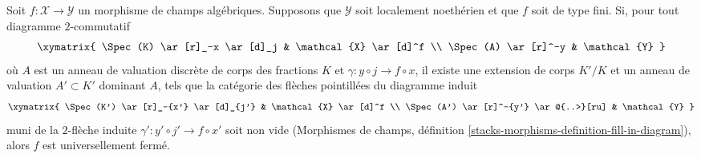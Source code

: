 \begin{lemma}
\label{lemma-valuative-criterion-universally-closed}
Soit $f : \mathcal{X} \to \mathcal{Y}$ un morphisme de champs algébriques.
Supposons que $\mathcal{Y}$ soit localement noethérien et que $f$ soit de type fini.
Si, pour tout diagramme $2$-commutatif
$$
\xymatrix{
\Spec(K) \ar[r]_-x \ar[d]_j & \mathcal{X} \ar[d]^f \\
\Spec(A) \ar[r]^-y & \mathcal{Y}
}
$$
où $A$ est un anneau de valuation discrète de corps des fractions $K$
et $\gamma : y \circ j \to f \circ x$, il existe une extension de corps $K'/K$
et un anneau de valuation $A' \subset K'$ dominant $A$, tels que
la catégorie des flèches pointillées du diagramme induit
$$
\xymatrix{
\Spec(K') \ar[r]_-{x'} \ar[d]_{j'} & \mathcal{X} \ar[d]^f \\
\Spec(A') \ar[r]^-{y'} \ar@{..>}[ru] & \mathcal{Y}
}
$$
muni de la $2$-flèche induite $\gamma' : y' \circ j' \to f \circ x'$
soit non vide (Morphismes de champs, définition
\ref{stacks-morphisms-definition-fill-in-diagram}), alors $f$ est
universellement fermé.
\end{lemma}

